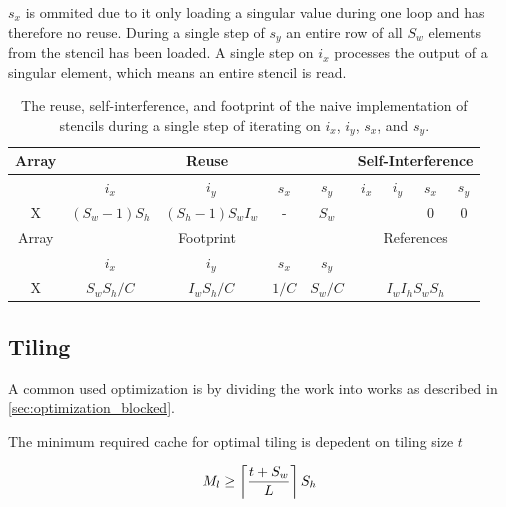$s_x$ is ommited due to it only loading a singular value during one loop and has therefore no reuse.
During a single step of $s_y$ an entire row of all $S_w$ elements from the stencil has been loaded.
A single step on $i_x$ processes the output of a singular element, which means an entire stencil is read.


\begin{table}[H]
    \centering
    \begin{tabular}{|c||c|c|c|c||c|c|c|c|}
        \hline
        Array & \multicolumn{4}{c||}{Reuse} & \multicolumn{4}{c|}{Self-Interference}
        \\ \hline
        & $i_x$ & $i_y$ & $s_x$ & $s_y$
        & $i_x$ & $i_y$ & $s_x$ & $s_y$
        \\ \hline
        X & $(S_w - 1)S_h$ & $(S_h - 1) S_w I_w$ & - & $S_w$
        & &  & 0 & 0

        \\ \hhline{*{9}{=}}
        Array & \multicolumn{4}{c||}{Footprint} &  \multicolumn{4}{c|}{References}
        \\ \hline
        & $i_x$ & $i_y$ & $s_x$ & $s_y$ & \multicolumn{4}{c|}{}
        \\ \hline
        X & $S_wS_h/C$ & $I_wS_h/C$ & $1/C$ & $S_w/C$ &
        \multicolumn{4}{c|}{$I_w I_h S_w S_h$}
        \\ \hline
    \end{tabular}

    \caption{
        The reuse, self-interference, and footprint of the naive implementation of stencils during a single step of iterating on $i_x$, $i_y$, $s_x$, and $s_y$.
    }
    \label{tab:stencil_naive_model}
\end{table}

\subsection{Tiling}
\label{sec:stencil_tiled}
A common used optimization is by dividing the work into works as described in \ref{sec:optimization_blocked}.

The minimum required cache for optimal tiling is depedent on \TODO{\dots} tiling size $t$

\begin{equation}
    M_l \geq \left\lceil \frac{t + S_w}{L} \right\rceil S_h \label{eq:stencil_tiling_memory}
\end{equation}

